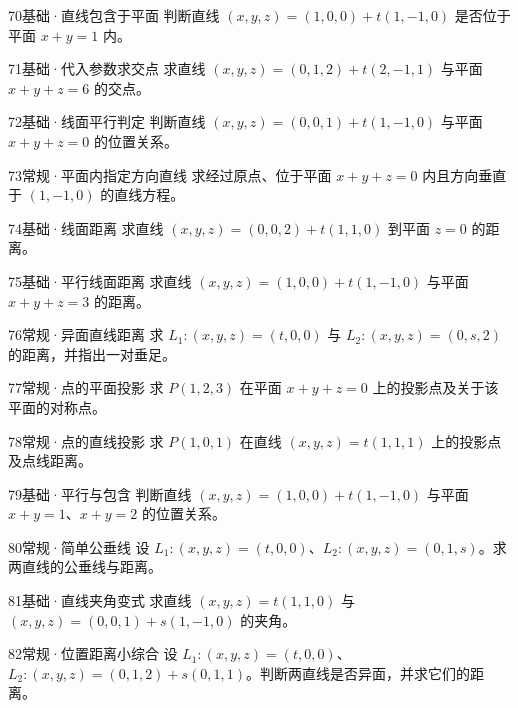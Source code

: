 \begin{exercise}{70}{基础·直线包含于平面}
判断直线 $(x,y,z)=(1,0,0)+t(1,-1,0)$ 是否位于平面 $x+y=1$ 内。
\end{exercise}
\begin{exercise}{71}{基础·代入参数求交点}
求直线 $(x,y,z)=(0,1,2)+t(2,-1,1)$ 与平面 $x+y+z=6$ 的交点。
\end{exercise}
\begin{exercise}{72}{基础·线面平行判定}
判断直线 $(x,y,z)=(0,0,1)+t(1,-1,0)$ 与平面 $x+y+z=0$ 的位置关系。
\end{exercise}
\begin{exercise}{73}{常规·平面内指定方向直线}
求经过原点、位于平面 $x+y+z=0$ 内且方向垂直于 $(1,-1,0)$ 的直线方程。
\end{exercise}
\begin{exercise}{74}{基础·线面距离}
求直线 $(x,y,z)=(0,0,2)+t(1,1,0)$ 到平面 $z=0$ 的距离。
\end{exercise}
\begin{exercise}{75}{基础·平行线面距离}
求直线 $(x,y,z)=(1,0,0)+t(1,-1,0)$ 与平面 $x+y+z=3$ 的距离。
\end{exercise}
\begin{exercise}{76}{常规·异面直线距离}
求 $L_1:(x,y,z)=(t,0,0)$ 与 $L_2:(x,y,z)=(0,s,2)$ 的距离，并指出一对垂足。
\end{exercise}
\begin{exercise}{77}{常规·点的平面投影}
求 $P(1,2,3)$ 在平面 $x+y+z=0$ 上的投影点及关于该平面的对称点。
\end{exercise}
\begin{exercise}{78}{常规·点的直线投影}
求 $P(1,0,1)$ 在直线 $(x,y,z)=t(1,1,1)$ 上的投影点及点线距离。
\end{exercise}
\begin{exercise}{79}{基础·平行与包含}
判断直线 $(x,y,z)=(1,0,0)+t(1,-1,0)$ 与平面 $x+y=1$、$x+y=2$ 的位置关系。
\end{exercise}
\begin{exercise}{80}{常规·简单公垂线}
设 $L_1:(x,y,z)=(t,0,0)$、$L_2:(x,y,z)=(0,1,s)$。求两直线的公垂线与距离。
\end{exercise}
\begin{exercise}{81}{基础·直线夹角变式}
求直线 $(x,y,z)=t(1,1,0)$ 与 $(x,y,z)=(0,0,1)+s(1,-1,0)$ 的夹角。
\end{exercise}
\begin{exercise}{82}{常规·位置距离小综合}
设 $L_1:(x,y,z)=(t,0,0)$、$L_2:(x,y,z)=(0,1,2)+s(0,1,1)$。判断两直线是否异面，并求它们的距离。
\end{exercise}
